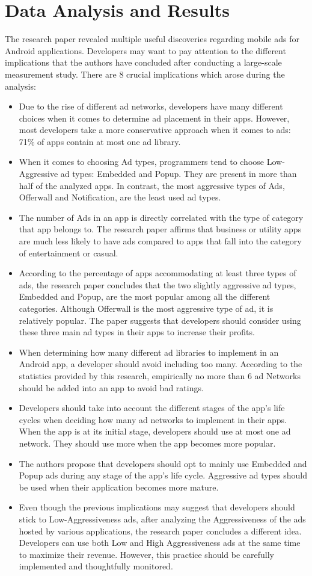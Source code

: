 \documentclass[conference]{IEEEtran}
\begin{document}
\section{Data Analysis and Results}
The research paper revealed multiple useful discoveries regarding mobile ads for Android applications. Developers may want to pay attention to the different implications that the authors have concluded after conducting a large-scale measurement study. There are 8 crucial implications which arose during the analysis:
\begin{itemize}
\item Due to the rise of different ad networks, developers have many different choices when it comes to determine ad placement in their apps. However, most developers take a more conservative approach when it comes to ads: 71\% of apps contain at most one ad library.
\item When it comes to choosing Ad types, programmers tend to choose Low-Aggressive ad types: Embedded and Popup. They are present in more than half of the analyzed apps. In contrast, the most aggressive types of Ads, Offerwall and Notification, are the least used ad types.
\item The number of Ads in an app is directly correlated with the type of category that app belongs to. The research paper affirms that business or utility apps are much less likely to have ads compared to apps that fall into the category of entertainment or casual.
\item According to the percentage of apps accommodating at least three types of ads, the research paper concludes that the two slightly aggressive ad types, Embedded and Popup, are the most popular among all the different categories. Although Offerwall is the most aggressive type of ad, it is relatively popular. The paper suggests that developers should consider using these three main ad types in their apps to increase their profits.
\item When determining how many different ad libraries to implement in an Android app, a developer should avoid including too many. According to the statistics provided by this research, empirically no more than 6 ad Networks should be added into an app to avoid bad ratings.
\item Developers should take into account the different stages of the app's life cycles when deciding how many ad networks to implement in their apps. When the app is at its initial stage, developers should use at most one ad network. They should use more when the app becomes more popular.
\item The authors propose that developers should opt to mainly use Embedded and Popup ads during any stage of the app's life cycle. Aggressive ad types should be used when their application becomes more mature.
\item Even though the previous implications may suggest that developers should stick to Low-Aggressiveness ads, after analyzing the Aggressiveness of the ads hosted by various applications, the research paper concludes a different idea. Developers can use both Low and High Aggressiveness ads at the same time to maximize their revenue. However, this practice should be carefully implemented and thoughtfully monitored.
\end{itemize}
\end{document}

